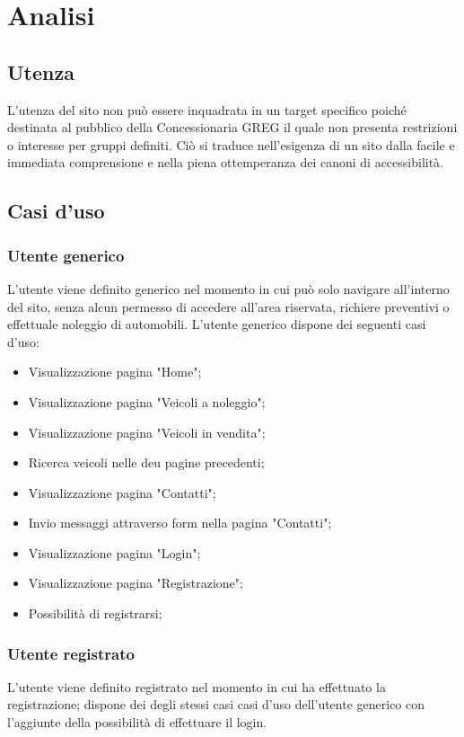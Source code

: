 \section{Analisi}

    \subsection{Utenza}
        L'utenza del sito non può essere inquadrata in un target specifico poiché destinata al pubblico della Concessionaria GREG il quale non presenta restrizioni o interesse per gruppi definiti. Ciò si traduce nell'esigenza di un sito dalla facile e immediata comprensione e nella piena ottemperanza dei canoni di accessibilità.

    \subsection{Casi d'uso}
        
        \subsubsection{Utente generico}
        L’utente viene definito generico nel momento in cui può solo navigare all’interno del sito, senza alcun permesso di accedere all’area riservata, richiere preventivi o effettuale noleggio di automobili.
        L’utente generico dispone dei seguenti casi d’uso:
        \begin{itemize}
            \item Visualizzazione pagina "Home";
            \item Visualizzazione pagina "Veicoli a noleggio";
            \item Visualizzazione pagina "Veicoli in vendita";
            \item Ricerca veicoli nelle deu pagine precedenti;
            \item Visualizzazione pagina "Contatti";
            \item Invio messaggi attraverso form nella pagina "Contatti";
            \item Visualizzazione pagina "Login";
            \item Visualizzazione pagina "Registrazione";
            \item Possibilità di registrarsi;
        \end{itemize}

        \subsubsection{Utente registrato}
        L’utente viene definito registrato nel momento in cui ha effettuato la registrazione; dispone dei degli stessi casi casi d’uso dell'utente generico con l'aggiunte della possibilità di effettuare il login.

